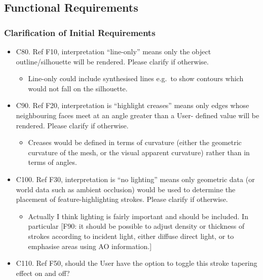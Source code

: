 \subsection{Functional Requirements}\label{functional-requirements}

\subsubsection{Clarification of Initial
Requirements}\label{clarification-of-initial-requirements-1}

\begin{itemize}
\tightlist
\item
  C80. Ref F10, interpretation ``line-only'' means only the object
  outline/silhouette will be rendered. Please clarify if otherwise.

  \begin{itemize}
  \tightlist
  \item
    Line-only could include synthesised lines e.g.~to show contours
    which would not fall on the silhouette.
  \end{itemize}
\item
  C90. Ref F20, interpretation is ``highlight creases'' means only edges
  whose neighbouring faces meet at an angle greater than a User- defined
  value will be rendered. Please clarify if otherwise.

  \begin{itemize}
  \tightlist
  \item
    Creases would be defined in terms of curvature (either the geometric
    curvature of the mesh, or the visual apparent curvature) rather than
    in terms of angles.
  \end{itemize}
\item
  C100. Ref F30, interpretation is ``no lighting'' means only geometric
  data (or world data such as ambient occlusion) would be used to
  determine the placement of feature-highlighting strokes. Please
  clarify if otherwise.

  \begin{itemize}
  \tightlist
  \item
    Actually I think lighting is fairly important and should be
    included. In particular {[}F90: it should be possible to adjust
    density or thickness of strokes according to incident light, either
    diffuse direct light, or to emphasise areas using AO information.{]}
  \end{itemize}
\item
  C110. Ref F50, should the User have the option to toggle this stroke
  tapering effect on and off?


\end{itemize}

